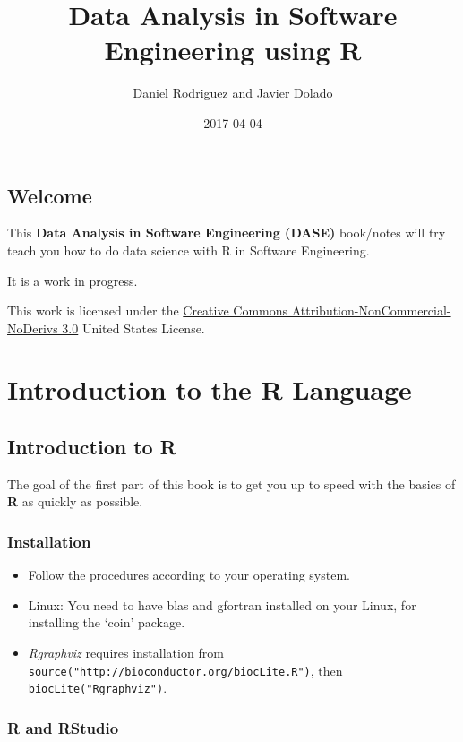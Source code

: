 \documentclass[]{book}
\title{Data Analysis in Software Engineering using R}
\author{Daniel Rodriguez and Javier Dolado}
\date{2017-04-04}
\providecommand{\tightlist}{%
  \setlength{\itemsep}{0pt}\setlength{\parskip}{0pt}}
\begin{document}
\maketitle

{
\setcounter{tocdepth}{1}
\tableofcontents
}
\chapter*{Welcome}\label{welcome}

This \textbf{Data Analysis in Software Engineering (DASE)} book/notes
will try teach you how to do data science with R in Software
Engineering.

It is a work in progress.

This work is licensed under the
\href{http://creativecommons.org/licenses/by-nc-nd/3.0/us/}{Creative
Commons Attribution-NonCommercial-NoDerivs 3.0} United States License.

\part{Introduction to the R
Language}\label{part-introduction-to-the-r-language}

\chapter{Introduction to R}\label{r-intro}

The goal of the first part of this book is to get you up to speed with
the basics of \textbf{R} as quickly as possible.

\section{Installation}\label{installation}

\begin{itemize}
\tightlist
\item
  Follow the procedures according to your operating system.
\item
  Linux: You need to have blas and gfortran installed on your Linux, for
  installing the `coin' package.
\item
  \emph{Rgraphviz} requires installation from
  \texttt{source("http://bioconductor.org/biocLite.R")}, then
  \texttt{biocLite("Rgraphviz")}.
\end{itemize}

\section{R and RStudio}\label{r-and-rstudio}
\end{document}
